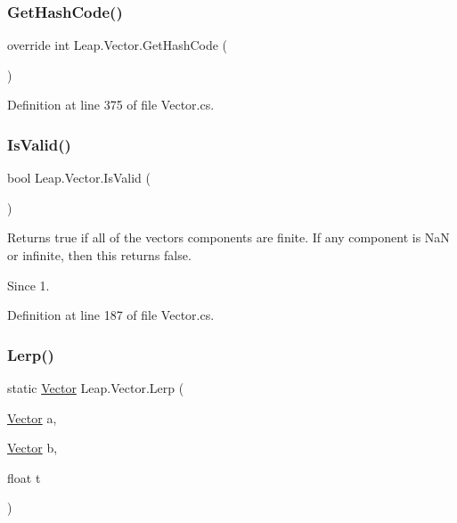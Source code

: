 \subsubsection{\texorpdfstring{GetHashCode()}{GetHashCode()}}
{\footnotesize\ttfamily override int Leap.\+Vector.\+Get\+Hash\+Code (\begin{DoxyParamCaption}{ }\end{DoxyParamCaption})}



Definition at line 375 of file Vector.\+cs.

\mbox{\label{struct_leap_1_1_vector_aae57324c0e393fc8f8b799092964efbb}} 
\subsubsection{\texorpdfstring{IsValid()}{IsValid()}}
{\footnotesize\ttfamily bool Leap.\+Vector.\+Is\+Valid (\begin{DoxyParamCaption}{ }\end{DoxyParamCaption})}



Returns true if all of the vector\textquotesingle{}s components are finite. If any component is NaN or infinite, then this returns false. 

\begin{DoxySince}{Since}
1. 
\end{DoxySince}


Definition at line 187 of file Vector.\+cs.

\mbox{\label{struct_leap_1_1_vector_a5732837cc5c84d689d44d9f3836fe639}} 
\subsubsection{\texorpdfstring{Lerp()}{Lerp()}}
{\footnotesize\ttfamily static \mbox{\hyperlink{struct_leap_1_1_vector}{Vector}} Leap.\+Vector.\+Lerp (\begin{DoxyParamCaption}\item[{\mbox{\hyperlink{struct_leap_1_1_vector}{Vector}}}]{a,  }\item[{\mbox{\hyperlink{struct_leap_1_1_vector}{Vector}}}]{b,  }\item[{float}]{t }\end{DoxyParamCaption})\hspace{0.3cm}{\ttfamily [static]}}



